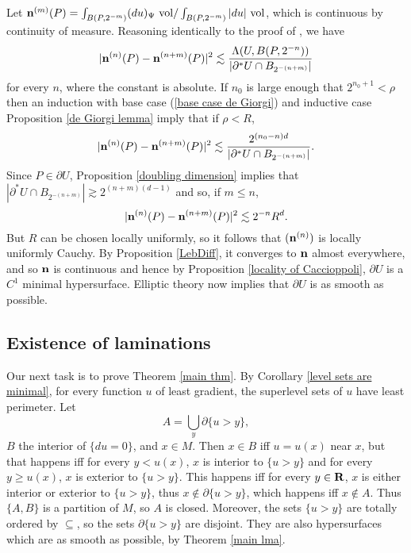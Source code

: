Let $\mathbf n^{(m)}(P) = \int_{B(P,2^{-m})} (du)_\Psi ~\mathrm{vol} / \int_{B(P,2^{-m})} |du| ~\mathrm{vol}$, which is continuous by continuity of measure.
Reasoning identically to the proof of \cite[(6.11)]{Miranda66}, we have 
$$|\mathbf n^{(n)}(P) - \mathbf n^{(n + m)}(P)|^2 \lesssim \frac{\Lambda(U, B(P, 2^{-n}))}{|\partial^* U \cap B_{2^{-(n + m)}}|}$$
for every $n$, where the constant is absolute.
If $n_0$ is large enough that $2^{n_0 + 1} < \rho$ then an induction with base case (\ref{base case de Giorgi}) and inductive case Proposition \ref{de Giorgi lemma} imply that if $\rho < R$,
$$|\mathbf n^{(n)}(P) - \mathbf n^{(n + m)}(P)|^2 \lesssim \frac{2^{(n_0-n)d}}{|\partial^* U \cap B_{2^{-(n + m)}}|}.$$
Since $P \in \partial U$, Proposition \ref{doubling dimension} implies that $|\partial^* U \cap B_{2^{-(n + m)}}| \gtrsim 2^{(n + m)(d - 1)}$
and so, if $m \leq n$,
$$|\mathbf n^{(n)}(P) - \mathbf n^{(n + m)}(P)|^2 \lesssim 2^{-n} R^d.$$
But $R$ can be chosen locally uniformly, so it follows that $(\mathbf n^{(n)})$ is locally uniformly Cauchy.
By Proposition \ref{LebDiff}, it converges to $\mathbf n$ almost everywhere, and so $\mathbf n$ is continuous and hence by Proposition \ref{locality of Caccioppoli}, $\partial U$ is a $C^1$ minimal hypersurface.
Elliptic theory \cite{morrey2009multiple} now implies that $\partial U$ is as smooth as possible.

\subsection{Existence of laminations}
Our next task is to prove Theorem \ref{main thm}.
By Corollary \ref{level sets are minimal}, for every function $u$ of least gradient, the superlevel sets of $u$ have least perimeter.
Let
\begin{equation}\label{lamination union}
A = \bigcup_y \partial \{u > y\},
\end{equation} $B$ the interior of $\{du = 0\}$, and $x \in M$.
Then $x \in B$ iff $u = u(x)$ near $x$, but that happens iff for every $y < u(x)$, $x$ is interior to $\{u > y\}$ and for every $y \geq u(x)$, $x$ is exterior to $\{u > y\}$.
This happens iff for every $y \in \mathbf{R}$, $x$ is either interior or exterior to $\{u > y\}$, thus $x \notin \partial \{u > y\}$, which happens iff $x \notin A$.
Thus $\{A, B\}$ is a partition of $M$, so $A$ is closed.
Moreover, the sets $\{u > y\}$ are totally ordered by $\subseteq$, so the sets $\partial \{u > y\}$ are disjoint.
They are also hypersurfaces which are as smooth as possible, by Theorem \ref{main lma}.

